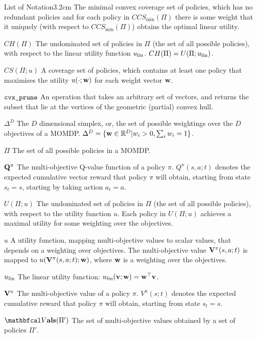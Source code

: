 \begin{mclistof}{List of Notation}{3.2cm}
        The minimal convex coverage set of policies, which has no redundant policies and for each policy in $CCS_{\min}(\Pi)$ there is some weight that it uniquely (with respect to $CCS_{\min}(\Pi)$) obtains the optimal linear utility.
    \item[$CH(\Pi)$] 
        The undominated set of policies in $\Pi$ (the set of all possible policies), with respect to the linear utility function $u_{{\textnormal{lin}}}$. $CH(\Pi)=U(\Pi;u_{{\textnormal{lin}}})$.
    \item[$CS(\Pi;u)$] 
        A coverage set of policies, which contains at least one policy that maximises the utility $u(\cdot;\mathbf{w})$ for each weight vector $\mathbf{w}$.
    \item[${\textnormal{\texttt{cvx\_prune}}}$] 
        An operation that takes an arbitrary set of vectors, and returns the subset that lie at the vertices of the geometric (partial) convex hull. 
    \item[$\Delta^D$] 
        The $D$ dimensional simplex, or, the set of possible weightings over the $D$ objectives of a MOMDP. $\Delta^D = \{\mathbf{w}\in\mathbb{R}^D|w_i > 0, \sum_i w_i = 1\}$.
    \item[$\Pi$] 
        The set of all possible policies in a MOMDP.
    \item[$\mathbf{Q}^{\pi}$]
        The multi-objective Q-value function of a policy $\pi$. $Q^{\pi}(s,a;t)$ denotes the expected cumulative vector reward that policy $\pi$ will obtain, starting from state $s_t=s$, starting by taking action $a_t=a$.
    \item[$U(\Pi;u)$] 
        The undominated set of policies in $\Pi$ (the set of all possible policies), with respect to the utility function $u$. Each policy in $U(\Pi;u)$ achieves a maximal utility for some weighting over the objectives.
    \item[$u$] 
        A utility function, mapping multi-objective values to scalar values, that depends on a weighting over objectives. The multi-objective value $\mathbf{V}^{\pi}(s,a;t)$ is mapped to $u(\mathbf{V}^{\pi}(s,a;t);\mathbf{w})$, where $\mathbf{w}$ is a weighting over the objectives.
    \item[$u_{{\textnormal{lin}}}$]
        The linear utility function: $u_{{\textnormal{lin}}}(\mathbf{v};\mathbf{w}) = \mathbf{w}^\top \mathbf{v}$.
    \item[$\mathbf{V}^{\pi}$]
        The multi-objective value of a policy $\pi$. $V^{\pi}(s;t)$ denotes the expected cumulative reward that policy $\pi$ will obtain, starting from state $s_t=s$.
    \item[$\valset(\Pi')$] 
        The set of multi-objective values obtained by a set of policies $\Pi'$.

\end{mclistof}
